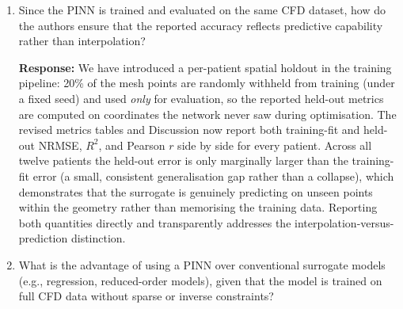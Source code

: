 \documentclass[11pt]{article}
\begin{document}
\begin{enumerate}[]
    \textbf{Response:} We acknowledge that, in the present framework, a separate PINN surrogate is trained for each patient under the fixed steady inflow used throughout the study. The per-patient spatial holdout (see R1-5 and the response to point~6 below) withholds 20\% of the mesh points under a fixed seed; the small, consistent train-to-holdout gap shows that each surrogate reproduces the CFD field at locations it never saw during training rather than memorising the training points, that is, it generalises to unseen locations \emph{within} the geometry. We are careful not to overstate this: a within-geometry spatial holdout is not cross-geometry generalisation. Predicting on an entirely unseen patient anatomy, or under a different flow condition, lies beyond the present per-patient formulation and would require retraining. We state this explicitly in the Limitations subsection of the revised manuscript, where we identify cross-patient generalisation, via transfer learning from a pre-trained backbone or a multi-patient encoder shared across geometries, as the principal direction for future work, since that is the architecture that would enable prediction on unseen geometries and leave-one-patient-out validation.

    \item Since the PINN is trained and evaluated on the same CFD dataset, how do the authors ensure that the reported accuracy reflects predictive capability rather than interpolation?

    \textbf{Response:} We have introduced a per-patient spatial holdout in the training pipeline: 20\% of the mesh points are randomly withheld from training (under a fixed seed) and used \emph{only} for evaluation, so the reported held-out metrics are computed on coordinates the network never saw during optimisation. The revised metrics tables and Discussion now report both training-fit and held-out NRMSE, $R^2$, and Pearson $r$ side by side for every patient. Across all twelve patients the held-out error is only marginally larger than the training-fit error (a small, consistent generalisation gap rather than a collapse), which demonstrates that the surrogate is genuinely predicting on unseen points within the geometry rather than memorising the training data. Reporting both quantities directly and transparently addresses the interpolation-versus-prediction distinction.

    \item What is the advantage of using a PINN over conventional surrogate models (e.g., regression, reduced-order models), given that the model is trained on full CFD data without sparse or inverse constraints?


\end{enumerate}
\end{document}
